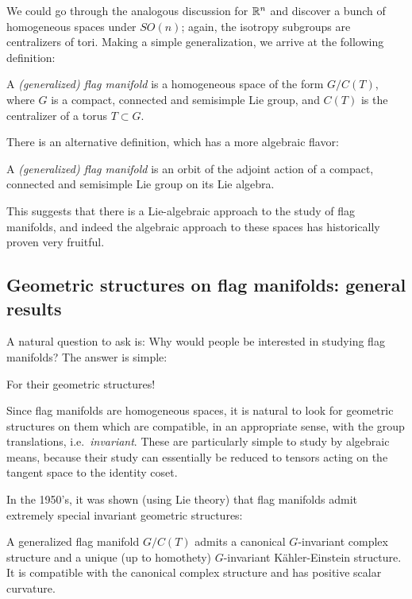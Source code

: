 \documentclass[parskip=half]{scrartcl}
\begin{document}
We could go through the analogous discussion for $\mathbb{R}^n$ and discover a bunch of homogeneous spaces under $SO(n)$; again, the isotropy subgroups are centralizers of tori. Making a simple generalization, we arrive at the following definition:

\begin{onboard}
	\begin{mydef}
		A \emph{(generalized) flag manifold} is a homogeneous space of the form $G/C(T)$, where $G$ is a compact, connected and semisimple Lie group, and $C(T)$ is the centralizer of a torus $T\subset G$.
	\end{mydef}
\end{onboard}

There is an alternative definition, which has a more algebraic flavor:

\begin{onboard}
	\begin{mydef}
		A \emph{(generalized) flag manifold} is an orbit of the adjoint action of a compact, connected and semisimple Lie group on its Lie algebra.
	\end{mydef}
\end{onboard}

This suggests that there is a Lie-algebraic approach to the study of flag manifolds, and indeed the algebraic approach to these spaces has historically proven very fruitful.

\subsection{Geometric structures on flag manifolds: general results}

A natural question to ask is: Why would people be interested in studying flag manifolds? The answer is simple: 
\begin{onboard}
	For their geometric structures!
\end{onboard} 
Since flag manifolds are homogeneous spaces, it is natural to look for geometric structures on them which are compatible, in an appropriate sense, with the group translations, i.e.~\emph{invariant}. These are particularly simple to study by algebraic means, because their study can essentially be reduced to tensors acting on the tangent space to the identity coset.
\begin{onboard}
	In the 1950's, it was shown (using Lie theory) that flag manifolds admit extremely special invariant geometric structures:

\begin{thm}
	A generalized flag manifold $G/C(T)$ admits a canonical $G$-invariant complex structure and a unique (up to homothety) $G$-invariant K\"ahler-Einstein structure. It is compatible with the canonical complex structure and has positive scalar curvature.
\end{thm}
\end{onboard}
\end{document}
